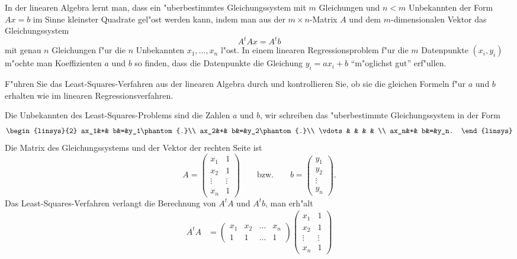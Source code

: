 In der linearen Algebra lernt man, dass ein "uberbestimmtes Gleichungssystem
mit $m$ Gleichungen und $n<m$ Unbekannten der Form $Ax=b$ im Sinne kleinster Quadrate
gel"ost werden kann, indem man aus der $m\times n$-Matrix $A$ und dem 
$m$-dimensionalen Vektor das Gleichungssystem
\[
A^tA x= A^tb
\]
mit genau $n$ Gleichungen f"ur die $n$ Unbekannten $x_1,\dots,x_n$ l"ost.
In einem linearen Regressionsproblem f"ur die $m$ Datenpunkte $(x_i,y_i)$
m"ochte man Koeffizienten $a$ und $b$ so finden, dass die Datenpunkte
die Gleichung $y_i=ax_i+b$ ``m"oglichst gut'' erf"ullen.

F"uhren Sie das Least-Squares-Verfahren aus der linearen Algebra durch und
kontrollieren Sie, ob sie die gleichen Formeln f"ur $a$ und $b$ erhalten
wie im linearen Regressionsverfahren.

\begin{loesung}
Die Unbekannten des Least-Squares-Problems sind die Zahlen $a$ und $b$,
wir schreiben das "uberbestimmte Gleichungssystem in der Form
\[
\begin{linsys}{2}
  ax_1&+&     b&=&y_1\phantom{.}\\
  ax_2&+&     b&=&y_2\phantom{.}\\
\vdots& &      & &   \\
  ax_n&+&     b&=&y_n.
\end{linsys}
\]
Die Matrix des Gleichungssystems und der Vektor der rechten Seite ist 
\[
A=
\begin{pmatrix}
x_1&1\\
x_2&1\\
\vdots&\vdots\\
x_n&1
\end{pmatrix}
\qquad
\text{bzw.}
\qquad
b=\begin{pmatrix}
y_1\\
y_2\\
\vdots\\
y_n
\end{pmatrix}.
\]
Das Least-Squares-Verfahren verlangt die Berechnung von $A^tA$ und $A^tb$,
man erh"alt
\[
\begin{aligned}
A^tA
&=\begin{pmatrix}
x_1&x_2&\dots&x_n\\
  1&  1&\dots&1
\end{pmatrix}
\begin{pmatrix}
x_1&1\\
x_2&1\\
\vdots&\vdots\\
x_n&1
\end{pmatrix}

\end{aligned}\]
\end{loesung}
